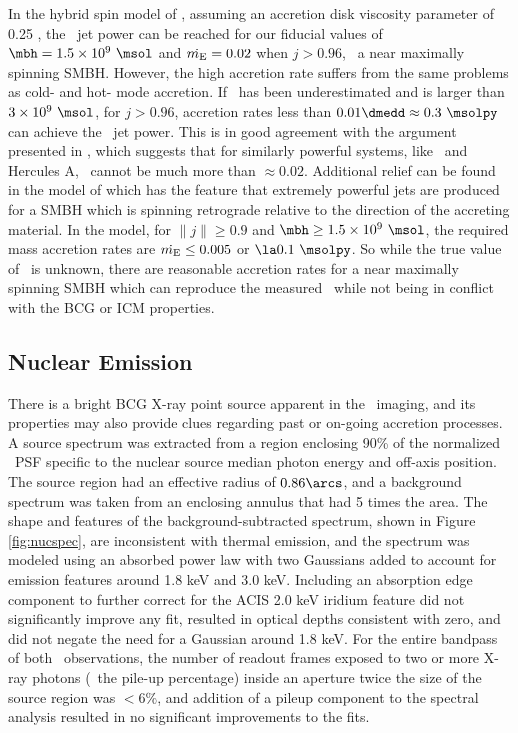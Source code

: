 \documentclass[11pt, preprint]{aastex}
\begin{document}
In the hybrid spin model of \citet{2007MNRAS.377.1652N}, assuming an
accretion disk viscosity parameter of 0.25
\citep{1999ApJ...520..298Q}, the \rbs\ jet power can be reached for
our fiducial values of $\mbh = 1.5 \times 10^9 ~\msol$ and $\dot{m_{\rm{E}}} =
0.02$ when $j > 0.96$, \ie\ a near maximally spinning SMBH. However,
the high accretion rate suffers from the same problems as cold- and
hot- mode accretion. If \mbh\ has been underestimated and is larger
than $3 \times 10^9 ~\msol$, for $j > 0.96$, accretion rates less than
$0.01 \dmedd \approx 0.3 ~\msolpy$ can achieve the \rbs\ jet
power. This is in good agreement with the argument presented in
\citet{minaspin}, which suggests that for similarly powerful systems,
like \ms\ and Hercules A, \dme\ cannot be much more than $\approx
0.02$. Additional relief can be found in the model of \citet{gesspin}
which has the feature that extremely powerful jets are produced for a
SMBH which is spinning retrograde relative to the direction of the
accreting material. In the \citet{gesspin} model, for $\|j\| \ge 0.9$
and $\mbh \ge 1.5 \times 10^9 ~\msol$, the required mass accretion
rates are $\dot{m_{\rm{E}}} \le 0.005$ or $\la 0.1 ~\msolpy$. So while the true
value of \dme\ is unknown, there are reasonable accretion rates for a
near maximally spinning SMBH which can reproduce the measured
\pjet\ while not being in conflict with the BCG or ICM properties.

\subsection{Nuclear Emission}
\label{sec:nuc}

There is a bright BCG X-ray point source apparent in the
\cxo\ imaging, and its properties may also provide clues regarding
past or on-going accretion processes. A source spectrum was extracted
from a region enclosing 90\% of the normalized \cxo\ PSF specific to
the nuclear source median photon energy and off-axis position. The
source region had an effective radius of $0.86\arcs$, and a background
spectrum was taken from an enclosing annulus that had 5 times the
area. The shape and features of the background-subtracted spectrum,
shown in Figure \ref{fig:nucspec}, are inconsistent with thermal
emission, and the spectrum was modeled using an absorbed power law
with two Gaussians added to account for emission features around 1.8
keV and 3.0 keV. Including an absorption edge component to further
correct for the ACIS 2.0 keV iridium feature did not significantly
improve any fit, resulted in optical depths consistent with zero, and
did not negate the need for a Gaussian around 1.8 keV. For the entire
bandpass of both \cxo\ observations, the number of readout frames
exposed to two or more X-ray photons (\ie\ the pile-up percentage)
inside an aperture twice the size of the source region was $< 6\%$,
and addition of a pileup component to the spectral analysis resulted
in no significant improvements to the fits.
\end{document}
